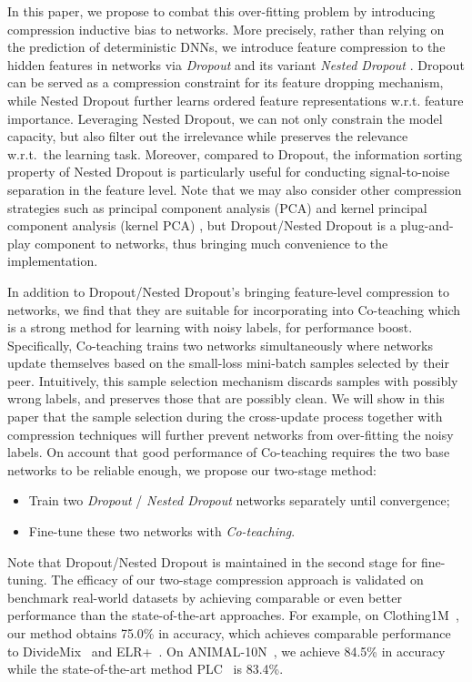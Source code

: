\documentclass[journal]{IEEEtran}
\begin{document}
In this paper, we propose to combat this over-fitting problem by introducing compression inductive bias to networks.
More precisely, rather than relying on the prediction of deterministic DNNs, we introduce feature compression
to the hidden features in networks via \textit{Dropout} \cite{srivastava2014dropout} and its variant \textit{Nested Dropout} \cite{rippel2014learning}.
Dropout can be served as a compression constraint for its feature dropping mechanism, while Nested Dropout further learns ordered feature representations w.r.t. feature importance.
Leveraging Nested Dropout, we can not only constrain the model capacity, but also filter out the irrelevance while preserves the relevance w.r.t.~the learning task.
Moreover, compared to Dropout, the information sorting property of Nested Dropout is particularly useful for conducting signal-to-noise separation in the feature level.
Note that we may also consider other compression strategies such as principal component analysis (PCA) and kernel principal component analysis (kernel PCA) \cite{suykens2002least}, but Dropout/Nested Dropout is a plug-and-play component to networks, thus bringing much convenience to the implementation.

In addition to Dropout/Nested Dropout's bringing feature-level compression to networks, we find that they are suitable for incorporating into Co-teaching \cite{han2018co} which is a strong method for learning with noisy labels, for performance boost.
Specifically, Co-teaching trains two networks simultaneously where networks update themselves based on the small-loss mini-batch samples selected by their peer.
Intuitively, this sample selection mechanism discards samples with possibly wrong labels, and preserves those that are possibly clean.
We will show in this paper that the sample selection during the cross-update process together with compression techniques
will further prevent networks from over-fitting the noisy labels.
On account that good performance of Co-teaching requires the two base networks to be reliable enough, we propose our two-stage method:

\begin{itemize}
    \item Train two \textit{Dropout} / \textit{Nested Dropout} networks separately until convergence;
    \item Fine-tune these two networks with \textit{Co-teaching}.
\end{itemize}
Note that Dropout/Nested Dropout is maintained in the second stage for fine-tuning.
The efficacy of our two-stage compression approach is validated on benchmark real-world datasets by achieving comparable or even better performance than the state-of-the-art approaches.
For example, on Clothing1M~\cite{xiao2015learning}, our method obtains 75.0\% in accuracy, which achieves comparable performance to DivideMix~\cite{li2020dividemix} and ELR+~\cite{liu2020early}. 
On ANIMAL-10N~\cite{song2019selfie}, 
we achieve 84.5\% in accuracy while the state-of-the-art method PLC~\cite{zhang2021learning} is 83.4\%.
\end{document}
